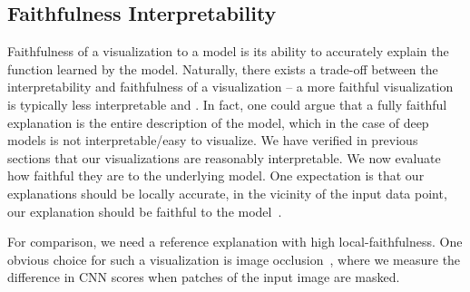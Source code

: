 \vspace{-20pt}
\subsection{Faithfulness \vs Interpretability}\label{sec:occ}

Faithfulness of a visualization to a model is its ability to accurately explain the function learned by the model.
Naturally, there exists a trade-off between the interpretability and faithfulness of a visualization --
a more faithful visualization is typically less interpretable and \viceversa.
In fact, one could argue that a fully faithful explanation is the entire description of the model, which in the case of deep models is not interpretable/easy to visualize.
We have verified in previous sections that our visualizations are reasonably interpretable.
We now evaluate how faithful they are to the underlying model.
One expectation is that our explanations should be locally accurate, \ie in the vicinity of the input data point, our explanation should be faithful to the model~\cite{lime_sigkdd16}.


For comparison, we need a reference explanation with high local-faithfulness.
One obvious choice for such a visualization is image occlusion~\cite{zeiler_eccv14}, where we measure the difference in CNN scores when patches of the input image are masked. %

